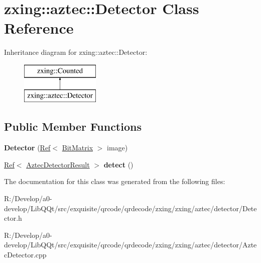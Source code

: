 \hypertarget{classzxing_1_1aztec_1_1_detector}{}\section{zxing\+:\+:aztec\+:\+:Detector Class Reference}
\label{classzxing_1_1aztec_1_1_detector}
Inheritance diagram for zxing\+:\+:aztec\+:\+:Detector\+:\begin{figure}[H]
\begin{center}
\leavevmode
\includegraphics[height=2.000000cm]{classzxing_1_1aztec_1_1_detector}
\end{center}
\end{figure}
\subsection*{Public Member Functions}
\begin{DoxyCompactItemize}
\item 
\mbox{\label{classzxing_1_1aztec_1_1_detector_a7f9ae270b02b5417e29c86ef6a64dd90}} 
{\bfseries Detector} (\mbox{\hyperlink{classzxing_1_1_ref}{Ref}}$<$ \mbox{\hyperlink{classzxing_1_1_bit_matrix}{Bit\+Matrix}} $>$ image)
\item 
\mbox{\label{classzxing_1_1aztec_1_1_detector_aaa6babd528778100ca9fd606a8c5fea8}} 
\mbox{\hyperlink{classzxing_1_1_ref}{Ref}}$<$ \mbox{\hyperlink{classzxing_1_1aztec_1_1_aztec_detector_result}{Aztec\+Detector\+Result}} $>$ {\bfseries detect} ()
\end{DoxyCompactItemize}


The documentation for this class was generated from the following files\+:\begin{DoxyCompactItemize}
\item 
R\+:/\+Develop/a0-\/develop/\+Lib\+Q\+Qt/src/exquisite/qrcode/qrdecode/zxing/zxing/aztec/detector/Detector.\+h\item 
R\+:/\+Develop/a0-\/develop/\+Lib\+Q\+Qt/src/exquisite/qrcode/qrdecode/zxing/zxing/aztec/detector/Aztec\+Detector.\+cpp\end{DoxyCompactItemize}
